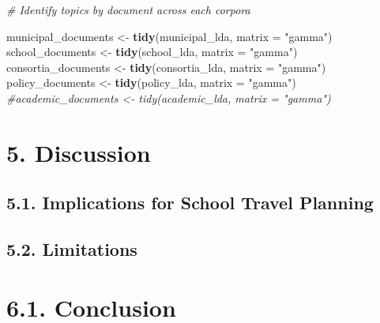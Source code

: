 \documentclass[]{elsarticle} %
\newenvironment{Shaded}{\begin{snugshade}}{\end{snugshade}}
\newcommand{\CommentTok}[1]{\textcolor[rgb]{0.56,0.35,0.01}{\textit{#1}}}
\newcommand{\DataTypeTok}[1]{\textcolor[rgb]{0.13,0.29,0.53}{#1}}
\newcommand{\KeywordTok}[1]{\textcolor[rgb]{0.13,0.29,0.53}{\textbf{#1}}}
\newcommand{\NormalTok}[1]{#1}
\newcommand{\StringTok}[1]{\textcolor[rgb]{0.31,0.60,0.02}{#1}}
\begin{document}
\begin{Shaded}
\end{Shaded}

\begin{Shaded}
\begin{Highlighting}[]
\CommentTok{# Identify topics by document across each corpora}

\NormalTok{municipal_documents <-}\StringTok{ }\KeywordTok{tidy}\NormalTok{(municipal_lda, }\DataTypeTok{matrix =} \StringTok{"gamma"}\NormalTok{)}
\NormalTok{school_documents <-}\StringTok{ }\KeywordTok{tidy}\NormalTok{(school_lda, }\DataTypeTok{matrix =} \StringTok{"gamma"}\NormalTok{)}
\NormalTok{consortia_documents <-}\StringTok{ }\KeywordTok{tidy}\NormalTok{(consortia_lda, }\DataTypeTok{matrix =} \StringTok{"gamma"}\NormalTok{)}
\NormalTok{policy_documents <-}\StringTok{ }\KeywordTok{tidy}\NormalTok{(policy_lda, }\DataTypeTok{matrix =} \StringTok{"gamma"}\NormalTok{)}
\CommentTok{#academic_documents <- tidy(academic_lda, matrix = "gamma")}
\end{Highlighting}
\end{Shaded}

\hypertarget{discussion}{%
\section{5. Discussion}\label{discussion}}

\hypertarget{implications-for-school-travel-planning}{%
\subsection{5.1. Implications for School Travel
Planning}\label{implications-for-school-travel-planning}}

\hypertarget{limitations}{%
\subsection{5.2. Limitations}\label{limitations}}

\hypertarget{conclusion}{%
\section{6.1. Conclusion}\label{conclusion}}
\end{document}
